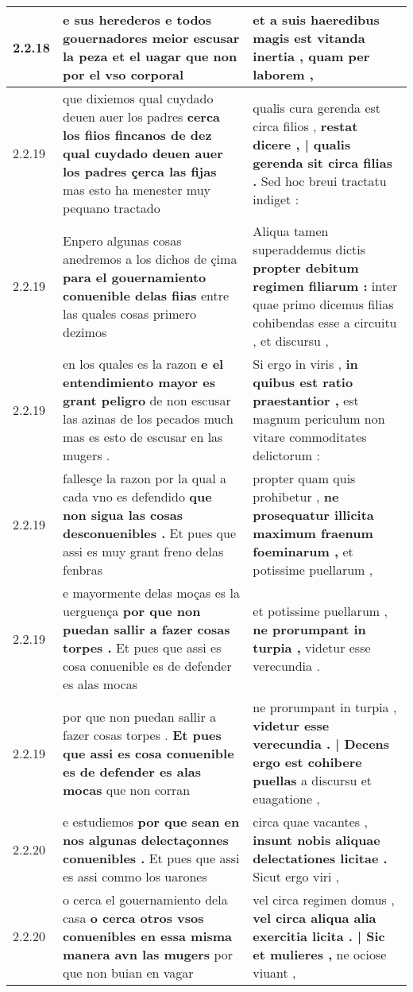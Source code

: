 \begin{tabular}{|p{1cm}|p{6.5cm}|p{6.5cm}|}
2.2.18 & e sus herederos \textbf{ e todos gouernadores meior escusar la peza et el uagar } que non por el vso corporal & et a suis haeredibus \textbf{ magis est vitanda inertia , } quam per laborem , \\\hline
2.2.19 & que dixiemos qual cuydado deuen auer los padres \textbf{ cerca los fiios fincanos de dez qual cuydado deuen auer los padres çerca las fijas } mas esto ha menester muy pequano tractado & qualis cura gerenda est circa filios , \textbf{ restat dicere , | qualis gerenda sit circa filias . } Sed hoc breui tractatu indiget : \\\hline
2.2.19 & Enpero algunas cosas anedremos a los dichos de çima \textbf{ para el gouernamiento conuenible delas fiias } entre las quales cosas primero dezimos & Aliqua tamen superaddemus dictis \textbf{ propter debitum regimen filiarum : } inter quae primo dicemus filias cohibendas esse a circuitu , et discursu , \\\hline
2.2.19 & en los quales es la razon \textbf{ e el entendimiento mayor es grant peligro } de non escusar las azinas de los pecados much mas es esto de escusar en las mugers . & Si ergo in viris , \textbf{ in quibus est ratio praestantior , } est magnum periculum non vitare commoditates delictorum : \\\hline
2.2.19 & fallesçe la razon por la qual a cada vno es defendido \textbf{ que non sigua las cosas desconuenibles . } Et pues que assi es muy grant freno delas fenbras & propter quam quis prohibetur , \textbf{ ne prosequatur illicita maximum fraenum foeminarum , } et potissime puellarum , \\\hline
2.2.19 & e mayormente delas moças es la uerguença \textbf{ por que non puedan sallir a fazer cosas torpes . } Et pues que assi es cosa conuenible es de defender es alas mocas & et potissime puellarum , \textbf{ ne prorumpant in turpia , } videtur esse verecundia . \\\hline
2.2.19 & por que non puedan sallir a fazer cosas torpes . \textbf{ Et pues que assi es cosa conuenible es de defender es alas mocas } que non corran & ne prorumpant in turpia , \textbf{ videtur esse verecundia . | Decens ergo est cohibere puellas } a discursu et euagatione , \\\hline
2.2.20 & e estudiemos \textbf{ por que sean en nos algunas delectaçonnes conuenibles . } Et pues que assi es assi commo los uarones & circa quae vacantes , \textbf{ insunt nobis aliquae delectationes licitae . } Sicut ergo viri , \\\hline
2.2.20 & o cerca el gouernamiento dela casa \textbf{ o cerca otros vsos conuenibles en essa misma manera avn las mugers } por que non buian en vagar & vel circa regimen domus , \textbf{ vel circa aliqua alia exercitia licita . | Sic et mulieres , } ne ociose viuant , \\\hline

\end{tabular}
